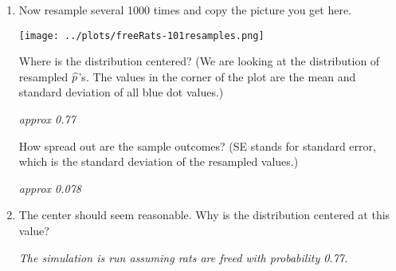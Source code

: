 \begin{enumerate}
    Then choose  . 
    What proportion of the rats were freed in your first resample?
    (Click the blue dot to see the resample.)
\begin{students}
  \vspace{1cm}
\end{students}

\begin{key}
{\it  AWV}
\end{key}

 \item Now resample several 1000 times and copy the picture you get here.
\begin{students}
  \vspace{4cm}
\end{students}

\begin{key}
  \texttt{[image: ../plots/freeRats-101resamples.png]}
\end{key} 

   Where is the distribution centered? (We are looking at the
   distribution of resampled $\widehat{p}$'s. The values in the corner of
   the plot are the mean and standard deviation of all blue dot values.) 
\begin{students}
  \vspace{.6cm}
\end{students}

\begin{key}
{\it  approx 0.77}
\end{key}

   How spread out are the sample outcomes? (SE stands for  standard
    error, which is the standard deviation of the resampled values.)
\begin{students}
  \vspace{.6cm}
\end{students}

\begin{key}
{\it  approx 0.078}
\end{key}

 \item The center should seem reasonable.  Why is the distribution
   centered at this value?
\begin{students}
  \vspace{1cm}
\end{students}

\begin{key}
{\it  The simulation is run assuming rats are freed with probability 0.77.}
\end{key}



\end{enumerate}
